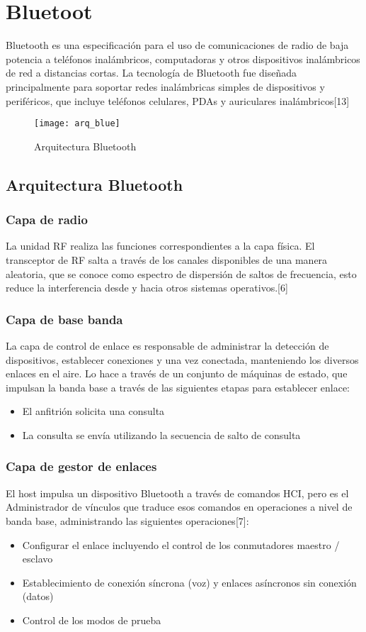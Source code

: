 \chapter{Bluetoot}
Bluetooth es una especificación para el uso de comunicaciones de radio de baja potencia a teléfonos inalámbricos, computadoras y otros dispositivos inalámbricos de red a distancias cortas. La tecnología de Bluetooth fue diseñada principalmente para soportar redes inalámbricas simples de dispositivos y periféricos, que incluye teléfonos celulares, PDAs y auriculares inalámbricos[13]

\begin{figure}[h]
    \centering
    \texttt{[image: arq\_blue]}
    \caption{Arquitectura Bluetooth}
\end{figure}

\section{Arquitectura Bluetooth}

\subsection{Capa de radio}
La unidad RF realiza las funciones correspondientes a la capa física. El transceptor de RF salta a través de los canales disponibles de una manera aleatoria, que se conoce como espectro de dispersión de saltos de frecuencia, esto reduce la interferencia desde y hacia otros sistemas operativos.[6]

\subsection{Capa de base banda}
La capa de control de enlace es responsable de administrar la detección de dispositivos, establecer conexiones y una vez conectada, manteniendo los diversos enlaces en el aire. Lo hace a través de un conjunto de máquinas de estado, que impulsan la banda base a través de las siguientes etapas para establecer enlace:
\begin{itemize}
    \item El anfitrión solicita una consulta
    \item La consulta se envía utilizando la secuencia de salto de consulta
\end{itemize}

\subsection{Capa de gestor de enlaces}
El host impulsa un dispositivo Bluetooth a través de comandos HCI, pero es el Administrador de vínculos que traduce esos comandos en operaciones a nivel de banda base, administrando las siguientes operaciones[7]:
\begin{itemize}
    \item Configurar el enlace incluyendo el control de los conmutadores maestro / esclavo
    \item Establecimiento de conexión síncrona (voz) y enlaces asíncronos sin conexión (datos)
    \item Control de los modos de prueba
\end{itemize}

